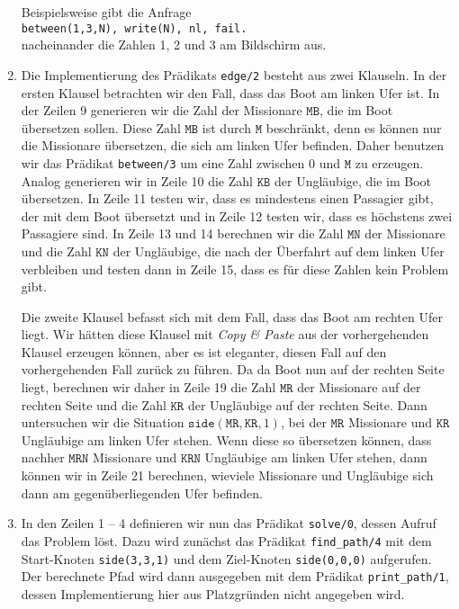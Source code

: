 \begin{enumerate}
      Beispielsweise gibt die Anfrage \\[0.1cm]
      \hspace*{1.3cm} \texttt{between(1,3,N), write(N), nl, fail.}  \\[0.1cm]
      nacheinander die Zahlen 1, 2 und 3 am Bildschirm aus.
    \item Die Implementierung des Prädikats \texttt{edge/2} besteht aus zwei Klauseln.  In
      der ersten Klausel betrachten wir den Fall, dass das Boot am linken Ufer ist.  In
      der Zeilen 9 generieren wir die Zahl der Missionare $\texttt{MB}$, die im Boot übersetzen
      sollen.  Diese Zahl $\texttt{MB}$ ist durch $\texttt{M}$ beschränkt, denn es können nur die Missionare
      übersetzen, die sich am linken Ufer befinden.  Daher benutzen wir das Prädikat
      \texttt{between/3} um eine Zahl zwischen 0 und $\texttt{M}$ zu erzeugen.  Analog generieren
      wir in Zeile 10 die Zahl $\texttt{KB}$ der Ungläubige, die im Boot übersetzen.  In Zeile 11
      testen wir, dass es mindestens einen Passagier gibt, der mit dem Boot übersetzt und
      in Zeile 12 testen wir, dass es höchstens zwei Passagiere sind.  In Zeile 13 und 14
      berechnen wir die Zahl $\texttt{MN}$ der Missionare und die Zahl $\texttt{KN}$ der Ungläubige, die
      nach der Überfahrt auf dem linken Ufer verbleiben und testen dann in Zeile 15, dass es
      für diese Zahlen kein Problem gibt.
      
      Die zweite Klausel befasst sich mit dem Fall, dass das Boot am rechten Ufer liegt.
      Wir hätten diese Klausel mit \textsl{Copy \& Paste} aus der vorhergehenden Klausel
      erzeugen können, aber es ist eleganter, diesen Fall auf den vorhergehenden Fall
      zurück zu führen.  Da da Boot nun auf der rechten Seite liegt, berechnen wir daher
      in Zeile 19 die Zahl $\texttt{MR}$ der Missionare auf der rechten Seite und die Zahl
      $\texttt{KR}$ der Ungläubige auf der rechten Seite.  Dann untersuchen wir die
      Situation $\mathtt{side}(\mathtt{MR}, \mathtt{KR}, 1)$, bei der $\texttt{MR}$
      Missionare und $\texttt{KR}$ Ungläubige am linken Ufer stehen.  Wenn diese so
      übersetzen können, dass nachher $\texttt{MRN}$ Missionare und $\texttt{KRN}$
      Ungläubige am linken Ufer stehen, dann können wir in Zeile 21 berechnen, wieviele
      Missionare und Ungläubige sich dann am gegenüberliegenden Ufer befinden.
\item In den Zeilen 1 -- 4 definieren wir nun das Prädikat \texttt{solve/0}, dessen Aufruf
      das Problem löst.  Dazu wird zunächst das Prädikat \texttt{find\_path/4} 
      mit dem Start-Knoten \texttt{side(3,3,1)} und dem Ziel-Knoten \texttt{side(0,0,0)}
      aufgerufen.   Der berechnete Pfad wird dann ausgegeben mit dem Prädikat
      \texttt{print\_path/1},
      dessen Implementierung hier aus Platzgründen nicht angegeben wird.
\end{enumerate}


